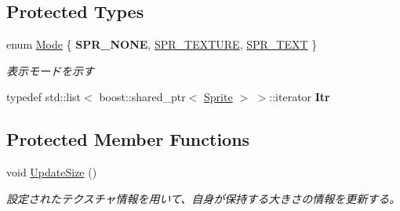 \subsection*{Protected Types}
\begin{DoxyCompactItemize}
\item 
enum \hyperlink{class_sprite_a7e6c7652514341b0ccd721166a1d00d1}{Mode} \{ {\bfseries S\+P\+R\+\_\+\+N\+O\+NE}, 
\hyperlink{class_sprite_a7e6c7652514341b0ccd721166a1d00d1a8396f95eb7d47c37ce60278c02644cb3}{S\+P\+R\+\_\+\+T\+E\+X\+T\+U\+RE}, 
\hyperlink{class_sprite_a7e6c7652514341b0ccd721166a1d00d1ab595e70dfd597d3d95865920928895cb}{S\+P\+R\+\_\+\+T\+E\+XT}
 \}\begin{DoxyCompactList}\small\item\em 表示モードを示す \end{DoxyCompactList}
\item 
typedef std\+::list$<$ boost\+::shared\+\_\+ptr$<$ \hyperlink{class_sprite}{Sprite} $>$ $>$\+::iterator {\bfseries Itr}\hypertarget{class_sprite_ac12e68e5dd906ef304b5e4997400371d}{}\label{class_sprite_ac12e68e5dd906ef304b5e4997400371d}

\end{DoxyCompactItemize}
\subsection*{Protected Member Functions}
\begin{DoxyCompactItemize}
\item 
void \hyperlink{class_sprite_a8b785863b8ac6c285512a0c842d0fdbb}{Update\+Size} ()\hypertarget{class_sprite_a8b785863b8ac6c285512a0c842d0fdbb}{}\label{class_sprite_a8b785863b8ac6c285512a0c842d0fdbb}

\begin{DoxyCompactList}\small\item\em 設定されたテクスチャ情報を用いて、自身が保持する大きさの情報を更新する。 \end{DoxyCompactList}\end{DoxyCompactItemize}
